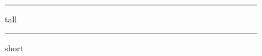 \documentclass{memoir}
\begin{document}
\large\sloppy\lipsum[1]
\begin{figure}[t]
  \hrule height 5in
  \caption{tall}
\end{figure}
\begin{figure}[t]
  \hrule height 1in
  \caption{short}
\end{figure}
\lipsum[2-4]
\end{document}
